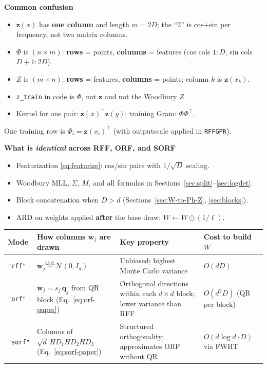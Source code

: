 \documentclass[11pt]{article}
\newcommand{\Sig}{\Sigma}
\newcommand{\Ph}{\Phi}
\newcommand{\Zmat}{Z}
\begin{document}
\begin{diffbox}
\textbf{Common confusion}
\begin{itemize}
  \item $\mathbf z(x)$ has \textbf{one column} and length $m=2D$; the ``2'' is cos$+$sin per frequency, not two matrix columns.
  \item $\Ph$ is $(n \times m)$: \textbf{rows} = points, \textbf{columns} = features (cos cols $1{:}D$, sin cols $D{+}1{:}2D$).
  \item $\Zmat$ is $(m \times n)$: \textbf{rows} = features, \textbf{columns} = points; column $k$ is $\mathbf z(x_k)$.
  \item \texttt{z\_train} in code is $\Ph$, not $\mathbf z$ and not the Woodbury $\Zmat$.
  \item Kernel for one pair: $\mathbf z(x)^{\top}\mathbf z(y)$; training Gram: $\Ph\Ph^{\top}$.
\end{itemize}
\end{diffbox}

One training row is $\Ph_i = \mathbf z(x_i)^{\top}$ (with outputscale applied in \texttt{RFFGPR}).

\begin{samebox}
\textbf{What is \emph{identical} across RFF, ORF, and SORF}
\begin{itemize}
  \item Featurization \eqref{eq:featurize}: cos/sin pairs with $1/\sqrt{D}$ scaling.
  \item Woodbury MLL, $\Sig$, $M$, and all formulas in Sections~\ref{sec:split}--\ref{sec:logdet}.
  \item Block concatenation when $D>d$ (Sections~\ref{sec:W-to-Ph-Z}, \ref{sec:blocks}).
  \item ARD on weights applied \textbf{after} the base draw: $W \leftarrow W \odot (1/\boldsymbol{\ell})$.
\end{itemize}
\end{samebox}

\begin{center}
\renewcommand{\arraystretch}{1.3}
\begin{tabular}{@{}p{}p{}p{}p{}@{}}
\toprule
\textbf{Mode} & \textbf{How columns $\mathbf w_j$ are drawn} & \textbf{Key property} & \textbf{Cost to build $W$} \\
\midrule
\texttt{"rff"} &
$\mathbf w_j \stackrel{\text{i.i.d.}}{\sim}\mathcal N(0,I_d)$ &
Unbiased; highest Monte Carlo variance &
$O(dD)$ \\
\texttt{"orf"} &
$\mathbf w_j = s_j\,\mathbf q_j$ from QR block (Eq.~\eqref{eq:orf-paper}) &
Orthogonal directions within each $d\times d$ block; lower variance than RFF &
$O(d^2 D)$ (QR per block) \\
\texttt{"sorf"} &
Columns of $\sqrt{d}\,H D_1 H D_2 H D_3$ (Eq.~\eqref{eq:sorf-paper}) &
Structured orthogonality; approximates ORF without QR &
$O(d\log d \cdot D)$ via FWHT \\
\bottomrule
\end{tabular}
\end{center}
\end{document}
